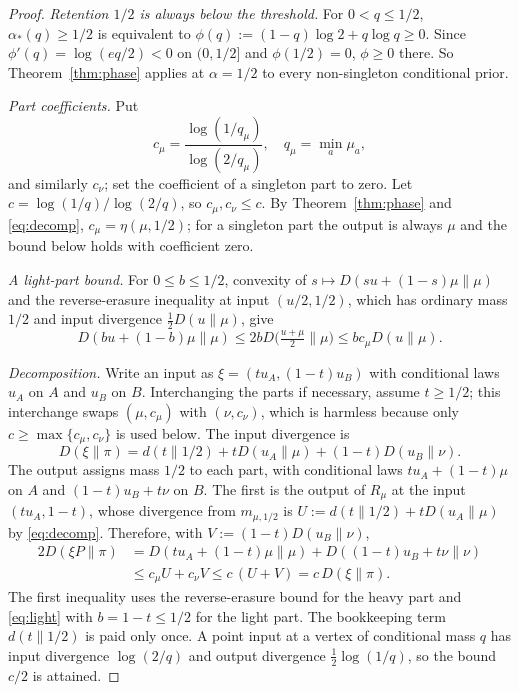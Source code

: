 \documentclass[11pt,a4paper]{article}
\numberwithin{equation}{section}
\theoremstyle{definition}
\theoremstyle{remark}
\newcommand{\KL}{D}
\newcommand{\ac}{\alpha_*}
\begin{document}
\begin{proof}
\emph{Retention \(1/2\) is always below the threshold.} For
\(0<q\le1/2\), \(\ac(q)\ge1/2\) is equivalent to
\(\phi(q):=(1-q)\log2+q\log q\ge0\). Since
\(\phi'(q)=\log(eq/2)<0\) on \((0,1/2]\) and \(\phi(1/2)=0\), \(\phi\ge0\)
there.
So Theorem~\ref{thm:phase} applies at \(\alpha=1/2\) to every
non-singleton conditional prior.

\emph{Part coefficients.} Put
\[
c_\mu=\frac{\log(1/q_\mu)}{\log(2/q_\mu)},\quad q_\mu=\min_a\mu_a,
\]
and similarly \(c_\nu\); set the coefficient of a singleton part to zero.
Let \(c=\log(1/q)/\log(2/q)\), so \(c_\mu,c_\nu\le c\). By
Theorem~\ref{thm:phase} and \eqref{eq:decomp}, \(c_\mu=\eta(\mu,1/2)\); for
a singleton part the output is always \(\mu\) and the bound below holds
with coefficient zero.

\emph{A light-part bound.} For \(0\le b\le1/2\), convexity of
\(s\mapsto\KL(su+(1-s)\mu\|\mu)\) and the reverse-erasure inequality at
input \((u/2,1/2)\), which has ordinary mass \(1/2\) and input divergence
\(\tfrac12\KL(u\|\mu)\), give
\begin{equation}\label{eq:light}
\KL(bu+(1-b)\mu\|\mu)
\le2b\KL\big(\tfrac{u+\mu}2\big\|\mu\big)
\le b c_\mu\KL(u\|\mu).
\end{equation}

\emph{Decomposition.} Write an input as \(\xi=(tu_A,(1-t)u_B)\) with
conditional laws \(u_A\) on \(A\) and \(u_B\) on \(B\). Interchanging the
parts if necessary, assume \(t\ge1/2\); this interchange swaps
\((\mu,c_\mu)\) with \((\nu,c_\nu)\), which is harmless because only
\(c\ge\max\{c_\mu,c_\nu\}\) is used below. The input divergence is
\begin{equation}\label{eq:graphinput}
\KL(\xi\|\pi)
=d(t\|1/2)+t\KL(u_A\|\mu)+(1-t)\KL(u_B\|\nu).
\end{equation}
The output assigns mass \(1/2\) to each part, with conditional laws
\(tu_A+(1-t)\mu\) on \(A\) and \((1-t)u_B+t\nu\) on \(B\). The first is the
output of \(R_\mu\) at the input \((tu_A,1-t)\), whose divergence from
\(m_{\mu,1/2}\) is \(U:=d(t\|1/2)+t\KL(u_A\|\mu)\) by \eqref{eq:decomp}.
Therefore, with \(V:=(1-t)\KL(u_B\|\nu)\),
\begin{align*}
2\KL(\xi P\|\pi)
&=\KL(tu_A+(1-t)\mu\|\mu)
 +\KL((1-t)u_B+t\nu\|\nu)\\
&\le c_\mu U+c_\nu V
\le c\,(U+V)=c\,\KL(\xi\|\pi).
\end{align*}
The first inequality uses the reverse-erasure bound for the heavy part and
\eqref{eq:light} with \(b=1-t\le1/2\) for the light part. The bookkeeping
term \(d(t\|1/2)\) is paid only once. A point input at a vertex of
conditional mass \(q\) has input divergence \(\log(2/q)\) and output
divergence \(\tfrac12\log(1/q)\), so the bound \(c/2\) is attained.


\end{proof}
\end{document}
